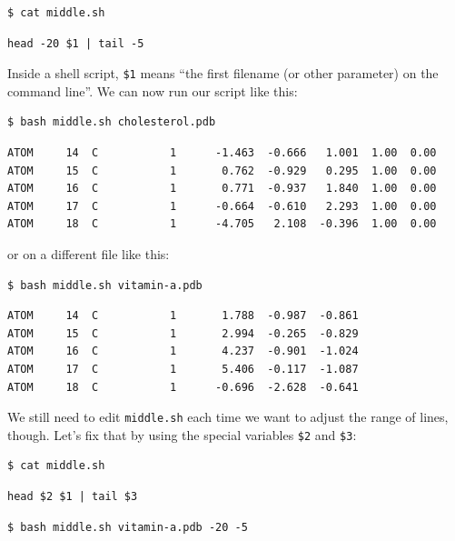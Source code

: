\documentclass{book}
\begin{document}
\begin{verbatim}
$ cat middle.sh
\end{verbatim}

\begin{verbatim}
head -20 $1 | tail -5
\end{verbatim}

Inside a shell script, \texttt{\$1} means ``the first filename (or other
parameter) on the command line''. We can now run our script like this:

\begin{verbatim}
$ bash middle.sh cholesterol.pdb
\end{verbatim}

\begin{verbatim}
ATOM     14  C           1      -1.463  -0.666   1.001  1.00  0.00
ATOM     15  C           1       0.762  -0.929   0.295  1.00  0.00
ATOM     16  C           1       0.771  -0.937   1.840  1.00  0.00
ATOM     17  C           1      -0.664  -0.610   2.293  1.00  0.00
ATOM     18  C           1      -4.705   2.108  -0.396  1.00  0.00
\end{verbatim}

or on a different file like this:

\begin{verbatim}
$ bash middle.sh vitamin-a.pdb
\end{verbatim}

\begin{verbatim}
ATOM     14  C           1       1.788  -0.987  -0.861
ATOM     15  C           1       2.994  -0.265  -0.829
ATOM     16  C           1       4.237  -0.901  -1.024
ATOM     17  C           1       5.406  -0.117  -1.087
ATOM     18  C           1      -0.696  -2.628  -0.641
\end{verbatim}

We still need to edit \texttt{middle.sh} each time we want to adjust the
range of lines, though. Let's fix that by using the special variables
\texttt{\$2} and \texttt{\$3}:

\begin{verbatim}
$ cat middle.sh
\end{verbatim}

\begin{verbatim}
head $2 $1 | tail $3
\end{verbatim}

\begin{verbatim}
$ bash middle.sh vitamin-a.pdb -20 -5
\end{verbatim}
\end{document}
